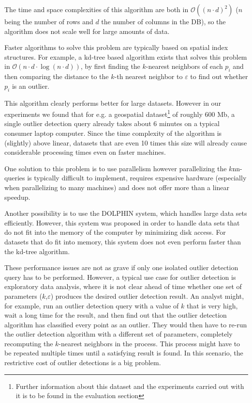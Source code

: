 \documentclass[runningheads]{llncs}
\begin{document}
The time and space complexities of this algorithm are both in $\mathcal{O}((n\cdot d)^2)$ ($n$ being the number of rows and $d$ the number of columns in the DB), so the algorithm does not scale well for large amounts of data.

Faster algorithms to solve this problem are typically based on spatial index structures. For example, a kd-tree based algorithm exists that solves this problem in $\mathcal{O}(n\cdot d \cdot\log(n\cdot d))$, by first finding the $k$-nearest neighbors of each $p_i$ and then comparing the distance to the $k$-th nearest neighbor to $\varepsilon$ to find out whether $p_i$ is an outlier. 

This algorithm clearly performs better for large datasets. However in our experiments we found that for e.g. a geospatial dataset\footnote{Further information about this dataset and the experiments carried out with it is to be found in the evaluation section} of roughly 600 Mb, a single outlier detection query already takes about 6 minutes on a typical consumer laptop computer. Since the time complexity of the algorithm is (slightly) above linear, datasets that are even 10 times this size will already cause considerable processing times even on faster machines.

One solution to this problem is to use parallelism \cite{parallel_knn}
however parallelizing the $k$nn-queries is typically difficult to implement, requires expensive hardware (especially when parallelizing to many machines) and does not offer more than a linear speedup.

Another possibility is to use the DOLPHIN system\cite{dolphin}, which handles large data sets efficiently. However, this system was proposed in order to handle data sets that do not fit into the memory of the computer by minimizing disk access. For datasets that do fit into memory, this system does not even perform faster than the kd-tree algorithm.

These performance issues are not as grave if only one isolated outlier detection query has to be performed. However, a typical use case for outlier detection is exploratory data analysis, where it is not clear ahead of time whether one set of parameters ($k$,$\varepsilon$) produces the desired outlier detection result. An analyst might, for example, run an outlier detection query with a value of $k$ that is very high, wait a long time for the result, and then find out that the outlier detection algorithm has classified every point as an outlier. They would then have to re-run the outlier detection algorithm with a different set of parameters, completely recomputing the $k$-nearest neighbors in the process. This process might have to be repeated multiple times until a satisfying result is found. In this scenario, the restrictive cost of outlier detections is a big problem.
\end{document}
